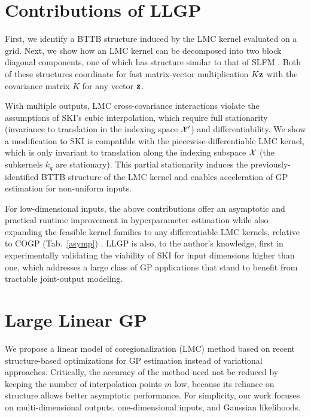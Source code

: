 \documentclass[twoside]{article}
\begin{document}
\section{Contributions of LLGP}\label{sec:contributions}

First, we identify a BTTB structure induced by the LMC kernel evaluated on a grid. Next, we show how an LMC kernel can be decomposed into two block diagonal components, one of which has structure similar to that of SLFM \citep{seeger2005semiparametric}. Both of these structures coordinate for fast matrix-vector multiplication $K\textbf{z}$ with the covariance matrix $K$ for any vector $\textbf{z}$.

With multiple outputs, LMC cross-covariance interactions violate the assumptions of SKI's cubic interpolation, which require full stationarity (invariance to translation in the indexing space $\mathcal{X}'$) and differentiability. We show a modification to SKI is compatible with the piecewise-differentiable LMC kernel, which is only invariant to translation along the indexing subspace $\mathcal{X}$ (the subkernels $k_q$ are stationary). This partial stationarity induces the previously-identified BTTB structure of the LMC kernel and enables acceleration of GP estimation for non-uniform inputs.

For low-dimensional inputs, the above contributions offer an asymptotic and practical runtime improvement in hyperparameter estimation while also expanding the feasible kernel families to any differentiable LMC kernels, relative to COGP (Tab.~\ref{asymp}) \citep{nguyen2014collaborative}. LLGP is also, to the author's knowledge, first in experimentally validating the viability of SKI for input dimensions higher than one, which addresses a large class of GP applications that stand to benefit from tractable joint-output modeling.

\section{Large Linear GP} \label{sec:matrix-free}

We propose a linear model of coregionalization (LMC) method based on recent structure-based optimizations for GP estimation instead of variational approaches. Critically, the accuracy of the method need not be reduced by keeping the number of interpolation points $m$ low, because its reliance on structure allows better asymptotic performance.
For simplicity, our work focuses on multi-dimensional outputs, one-dimensional inputs, and Gaussian likelihoods.
\end{document}
